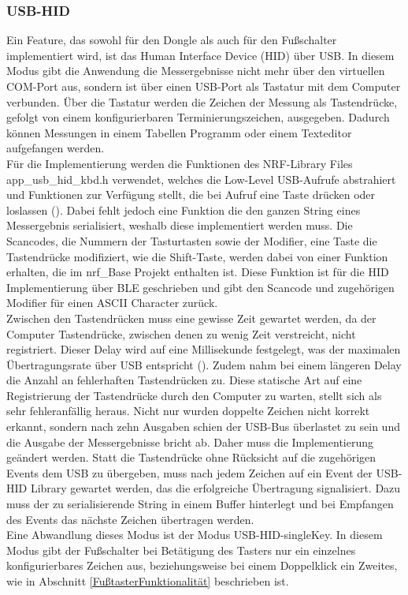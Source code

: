 \subsubsection{USB-HID}
Ein Feature, das sowohl für den Dongle als auch für den Fußschalter implementiert wird, ist das Human Interface Device (HID) über USB. In diesem Modus gibt die Anwendung die Messergebnisse nicht mehr über den virtuellen COM-Port aus, sondern ist über einen \ac{USB}-Port als Tastatur mit dem Computer verbunden. Über die Tastatur werden die Zeichen der Messung als Tastendrücke, gefolgt von einem konfigurierbaren Terminierungszeichen, ausgegeben. Dadurch können Messungen in einem Tabellen Programm oder einem Texteditor aufgefangen werden.\\
Für die Implementierung werden die Funktionen des NRF-Library Files app\_usb\_hid\_kbd.h verwendet, welches die Low-Level \ac{USB}-Aufrufe abstrahiert und Funktionen zur Verfügung stellt, die bei Aufruf eine Taste drücken oder loslassen (\cite{NRF_USB_HID_keyboard}). Dabei fehlt jedoch eine Funktion die den ganzen String eines Messergebnis serialisiert, weshalb diese implementiert werden muss. Die Scancodes, die Nummern der Tasturtasten sowie der Modifier, eine Taste die Tastendrücke modifiziert, wie die Shift-Taste, werden dabei von einer Funktion erhalten, die im nrf\_Base Projekt enthalten ist. Diese Funktion ist für die \ac{HID} Implementierung über \ac{BLE} geschrieben und gibt den Scancode und zugehörigen Modifier für einen \ac{ASCII} Character zurück.\\
Zwischen den Tastendrücken muss eine gewisse Zeit gewartet werden, da der Computer Tastendrücke, zwischen denen zu wenig Zeit verstreicht, nicht registriert. Dieser Delay wird auf eine Millisekunde festgelegt, was der maximalen Übertragungsrate über \ac{USB} entspricht (\cite[17]{HID_USB_Specification}). Zudem nahm bei einem längeren Delay die Anzahl an fehlerhaften Tastendrücken zu. Diese statische Art auf eine Registrierung der Tastendrücke durch den Computer zu warten, stellt sich als sehr fehleranfällig heraus. Nicht nur wurden doppelte Zeichen nicht korrekt erkannt, sondern nach zehn Ausgaben schien der \ac{USB}-Bus überlastet zu sein und die Ausgabe der Messergebnisse bricht ab. Daher muss die Implementierung geändert werden. Statt die Tastendrücke ohne Rücksicht auf die zugehörigen Events dem \ac{USB} zu übergeben, muss nach jedem Zeichen auf ein Event der \ac{USB}-\ac{HID} Library gewartet werden, das die erfolgreiche Übertragung signalisiert. Dazu muss der zu serialisierende String in einem Buffer hinterlegt und bei Empfangen des Events das nächste Zeichen übertragen werden.\\
Eine Abwandlung dieses Modus ist der Modus \ac{USB}-\ac{HID}-singleKey. In diesem Modus gibt der Fußschalter bei Betätigung des Tasters nur ein einzelnes konfigurierbares Zeichen aus, beziehungsweise bei einem Doppelklick ein Zweites, wie in Abschnitt \ref{FußtasterFunktionalität} beschrieben ist.

